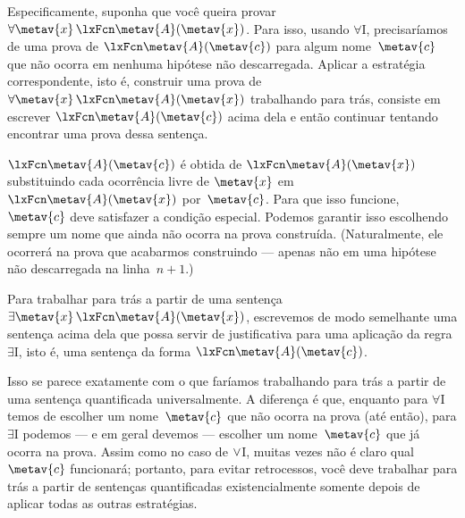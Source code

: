 Especificamente, suponha que você queira provar $\forall \metav{x}\, \atom{\metav{A}}{\metav{x}}$. Para isso, usando $\forall$I, precisaríamos de uma prova de $\atom{\metav{A}}{\metav{c}}$ para algum nome~$\metav{c}$ que não ocorra em nenhuma hipótese não descarregada. Aplicar a estratégia correspondente, isto é, construir uma prova de $\forall \metav{x}\, \atom{\metav{A}}{\metav{x}}$ trabalhando para trás, consiste em escrever $\atom{\metav{A}}{\metav{c}}$ acima dela e então continuar tentando encontrar uma prova dessa sentença.
\begin{fitchproof}
	\ellipsesline
\end{fitchproof}
$\atom{\metav{A}}{\metav{c}}$ é obtida de $\atom{\metav{A}}{\metav{x}}$ substituindo cada ocorrência livre de $\metav{x}$ em $\atom{\metav{A}}{\metav{x}}$ por~$\metav{c}$. Para que isso funcione, $\metav{c}$ deve satisfazer a condição especial. Podemos garantir isso escolhendo sempre um nome que ainda não ocorra na prova construída. (Naturalmente, ele ocorrerá na prova que acabarmos construindo — apenas não em uma hipótese não descarregada na linha~$n+1$.)

Para trabalhar para trás a partir de uma sentença $\exists \metav{x}\, \atom{\metav{A}}{\metav{x}}$, escrevemos de modo semelhante uma sentença acima dela que possa servir de justificativa para uma aplicação da regra $\exists$I, isto é, uma sentença da forma $\atom{\metav{A}}{\metav{c}}$.
\begin{fitchproof}
	\ellipsesline
\end{fitchproof}
Isso se parece exatamente com o que faríamos trabalhando para trás a partir de uma sentença quantificada universalmente. A diferença é que, enquanto para $\forall$I temos de escolher um nome~$\metav{c}$ que não ocorra na prova (até então), para $\exists$I podemos — e em geral devemos — escolher um nome~$\metav{c}$ que já ocorra na prova. Assim como no caso de $\vee$I, muitas vezes não é claro qual $\metav{c}$ funcionará; portanto, para evitar retrocessos, você deve trabalhar para trás a partir de sentenças quantificadas existencialmente somente depois de aplicar todas as outras estratégias.

